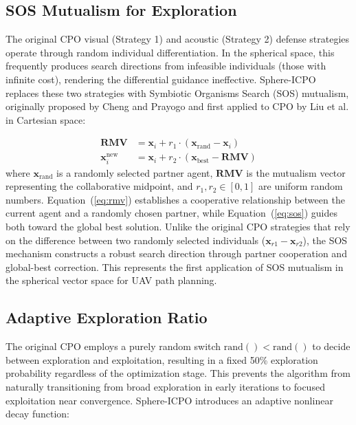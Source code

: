 \documentclass[11pt,a4paper]{article}
\begin{document}
\subsection{SOS Mutualism for Exploration}

The original CPO visual (Strategy 1) and acoustic (Strategy 2) defense strategies operate through random individual differentiation. In the spherical space, this frequently produces search directions from infeasible individuals (those with infinite cost), rendering the differential guidance ineffective. Sphere-ICPO replaces these two strategies with Symbiotic Organisms Search (SOS) mutualism, originally proposed by Cheng and Prayogo and first applied to CPO by Liu et al. in Cartesian space:

\begin{align}
    \mathbf{RMV} &= \mathbf{x}_i + r_1 \cdot (\mathbf{x}_{\text{rand}} - \mathbf{x}_i) \label{eq:rmv} \\
    \mathbf{x}_i^{\text{new}} &= \mathbf{x}_i + r_2 \cdot (\mathbf{x}_{\text{best}} - \mathbf{RMV}) \label{eq:sos}
\end{align}
where $\mathbf{x}_{\text{rand}}$ is a randomly selected partner agent, $\mathbf{RMV}$ is the mutualism vector representing the collaborative midpoint, and $r_1, r_2 \in [0,1]$ are uniform random numbers. Equation~(\ref{eq:rmv}) establishes a cooperative relationship between the current agent and a randomly chosen partner, while Equation~(\ref{eq:sos}) guides both toward the global best solution. Unlike the original CPO strategies that rely on the difference between two randomly selected individuals ($\mathbf{x}_{r1} - \mathbf{x}_{r2}$), the SOS mechanism constructs a robust search direction through partner cooperation and global-best correction. This represents the first application of SOS mutualism in the spherical vector space for UAV path planning.

\subsection{Adaptive Exploration Ratio}

The original CPO employs a purely random switch $\text{rand}() < \text{rand}()$ to decide between exploration and exploitation, resulting in a fixed 50\% exploration probability regardless of the optimization stage. This prevents the algorithm from naturally transitioning from broad exploration in early iterations to focused exploitation near convergence. Sphere-ICPO introduces an adaptive nonlinear decay function:
\end{document}
